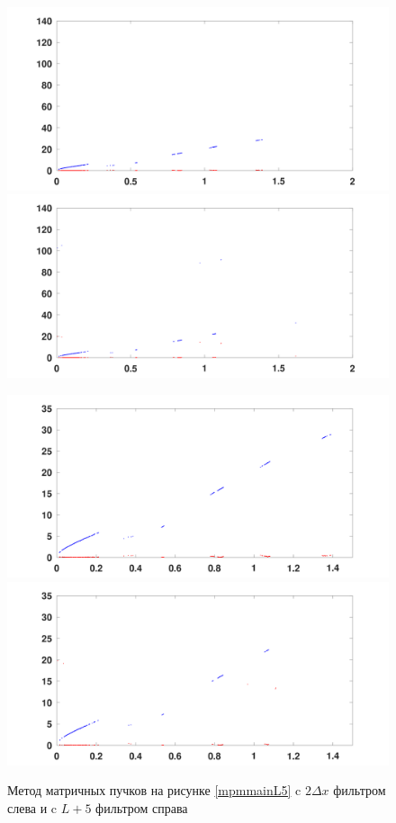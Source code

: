 \documentclass{article}
\begin{document}
	\begin{figure}[!h]
		\begin{center}
			\includegraphics[width=0.5\linewidth]{images/matrix_pencil_method/dx_filter.png}\includegraphics[width=0.5\linewidth]{images/matrix_pencil_method/L_filter.png}
			
			\includegraphics[width=0.5\linewidth]{images/matrix_pencil_method/dx_filter_near.png}\includegraphics[width=0.5\linewidth]{images/matrix_pencil_method/L_filter_near.png}
			\caption{Метод матричных пучков на рисунке \ref{mpmmainL5} c $2\Delta x$ фильтром слева и c $L+5$ фильтром справа}
		\end{center}
	\end{figure}
\end{document}
